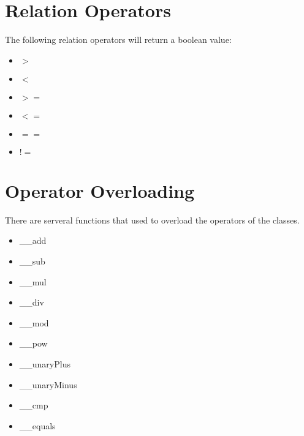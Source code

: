 \section{Relation Operators}
The following relation operators will return a boolean value:
\begin{itemize}
	\item $>$
	\item $<$
	\item $>=$
	\item $<=$
	\item $==$
	\item $!=$
\end{itemize}
\section{Operator Overloading}
There are serveral functions that used to overload the operators of the classes.
\begin{itemize}
	\item \_\_add
	\item \_\_sub
	\item \_\_mul
	\item \_\_div
	\item \_\_mod
	\item \_\_pow
	\item \_\_unaryPlus
	\item \_\_unaryMinus
	\item \_\_cmp
	\item \_\_equals
\end{itemize}
